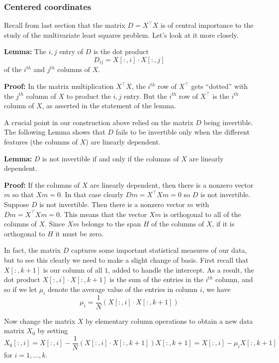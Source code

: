\documentclass[
]{article}
\begin{document}
\hypertarget{centered-coordinates}{%
\subsubsection{Centered coordinates}\label{centered-coordinates}}

Recall from last section that the matrix \(D=X^{\intercal}X\) is of
central importance to the study of the multivariate least squares
problem. Let's look at it more closely.

\textbf{Lemma:} The \(i,j\) entry of \(D\) is the dot product \[
D_{ij}=X[:,i]\cdot X[:,j]
\] of the \(i^{th}\) and \(j^{th}\) columns of \(X\).

\textbf{Proof:} In the matrix multiplication \(X^{\intercal}X\), the
\(i^{th}\) row of \(X^{\intercal}\) gets ``dotted'' with the \(j^{th}\)
column of \(X\) to product the \(i,j\) entry. But the \(i^{th}\) row of
\(X^{\intercal}\) is the \(i^{th}\) column of \(X\), as asserted in the
statement of the lemma.

A crucial point in our construction above relied on the matrix \(D\)
being invertible. The following Lemma shows that \(D\) fails to be
invertible only when the different features (the columns of \(X\)) are
linearly dependent.

\textbf{Lemma:} \(D\) is not invertible if and only if the columns of
\(X\) are linearly dependent.

\textbf{Proof:} If the columns of \(X\) are linearly dependent, then
there is a nonzero vector \(m\) so that \(Xm=0\). In that case clearly
\(Dm=X^{\intercal}Xm=0\) so \(D\) is not invertible. Suppose \(D\) is
not invertible. Then there is a nonzero vector \(m\) with
\(Dm=X^{\intercal}Xm=0\). This means that the vector \(Xm\) is
orthogonal to all of the columns of \(X\). Since \(Xm\) belongs to the
span \(H\) of the columns of \(X\), if it is orthogonal to \(H\) it must
be zero.

In fact, the matrix \(D\) captures some important statistical measures
of our data, but to see this clearly we need to make a slight change of
basis. First recall that \(X[:,k+1]\) is our column of all \(1\), added
to handle the intercept. As a result, the dot product
\(X[:,i]\cdot X[:,k+1]\) is the sum of the entries in the \(i^{th}\)
column, and so if we let \(\mu_{i}\) denote the average value of the
entries in column \(i\), we have \[
\mu_{i} = \frac{1}{N}(X[:,i]\cdot X[:,k+1])
\]

Now change the matrix \(X\) by elementary column operations to obtain a
new data matrix \(X_{0}\) by setting \[
X_{0}[:,i] = X[:,i]-\frac{1}{N}(X[:,i]\cdot X[:,k+1])X[:,k+1] = X[:,i]-\mu_{i}X[:,k+1]
\] for \(i=1,\ldots, k\).
\end{document}
